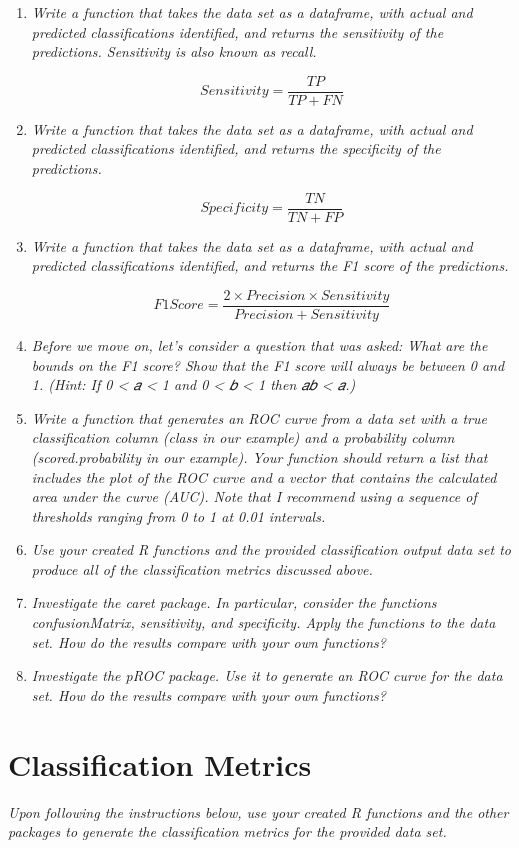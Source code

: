 \documentclass[
  11pt]{article}
\begin{document}
\begin{enumerate}
  \[
  𝑃𝑟𝑒𝑐𝑖𝑠𝑖𝑜𝑛 = \frac{𝑇𝑃}{𝑇𝑃 + 𝐹𝑃}
  \]
\item
  \emph{Write a function that takes the data set as a dataframe, with
  actual and predicted classifications identified, and returns the
  sensitivity of the predictions. Sensitivity is also known as recall.}

  \[
  𝑆𝑒𝑛𝑠𝑖𝑡𝑖𝑣𝑖𝑡𝑦 = \frac{𝑇𝑃}{𝑇𝑃 + 𝐹𝑁}
  \]
\item
  \emph{Write a function that takes the data set as a dataframe, with
  actual and predicted classifications identified, and returns the
  specificity of the predictions.}

  \[
  𝑆𝑝𝑒𝑐𝑖𝑓𝑖𝑐𝑖𝑡𝑦 = \frac{𝑇𝑁}{𝑇𝑁 + 𝐹𝑃}
  \]
\item
  \emph{Write a function that takes the data set as a dataframe, with
  actual and predicted classifications identified, and returns the F1
  score of the predictions.}

  \[
  𝐹1 𝑆𝑐𝑜𝑟𝑒 = \frac{2 × 𝑃𝑟𝑒𝑐𝑖𝑠𝑖𝑜𝑛 × 𝑆𝑒𝑛𝑠𝑖𝑡𝑖𝑣𝑖𝑡𝑦}{𝑃𝑟𝑒𝑐𝑖𝑠𝑖𝑜𝑛 + 𝑆𝑒𝑛𝑠𝑖𝑡𝑖𝑣𝑖𝑡𝑦}
  \]
\item
  \emph{Before we move on, let's consider a question that was asked:
  What are the bounds on the F1 score? Show that the F1 score will
  always be between 0 and 1. (Hint: If 0 \textless{} 𝑎 \textless{} 1 and
  0 \textless{} 𝑏 \textless{} 1 then 𝑎𝑏 \textless{} 𝑎.)}
\item
  \emph{Write a function that generates an ROC curve from a data set
  with a true classification column (class in our example) and a
  probability column (scored.probability in our example). Your function
  should return a list that includes the plot of the ROC curve and a
  vector that contains the calculated area under the curve (AUC). Note
  that I recommend using a sequence of thresholds ranging from 0 to 1 at
  0.01 intervals.}
\item
  \emph{Use your created R functions and the provided classification
  output data set to produce all of the classification metrics discussed
  above.}
\item
  \emph{Investigate the caret package. In particular, consider the
  functions confusionMatrix, sensitivity, and specificity. Apply the
  functions to the data set. How do the results compare with your own
  functions?}
\item
  \emph{Investigate the pROC package. Use it to generate an ROC curve
  for the data set. How do the results compare with your own functions?}
\end{enumerate}

\section{Classification Metrics}\label{classification-metrics}

\emph{Upon following the instructions below, use your created R
functions and the other packages to generate the classification metrics
for the provided data set.}
\end{document}
